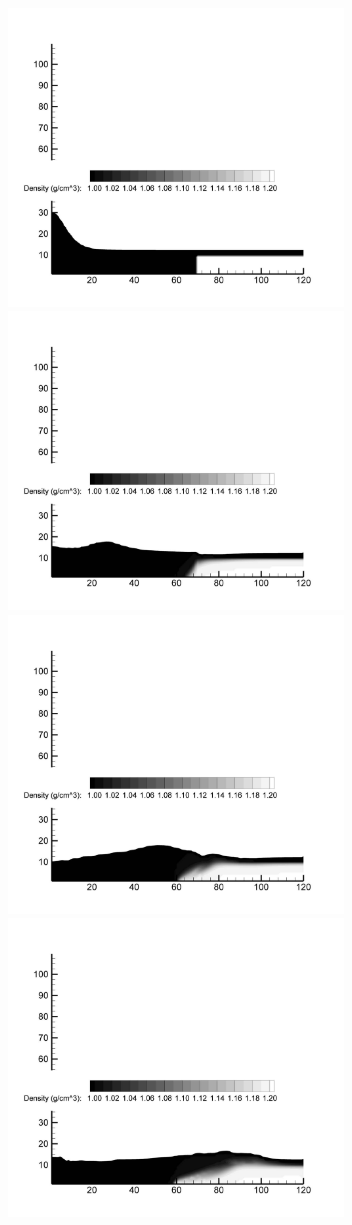 \begin{figure}[h]
\begin{center}
\includegraphics[width=3.5in]{../figures/SRM/000.pdf}
\includegraphics[width=3.5in]{../figures/SRM/025.pdf}
\includegraphics[width=3.5in]{../figures/SRM/050.pdf}
\includegraphics[width=3.5in]{../figures/SRM/075.pdf}

\end{center}
\end{figure}
